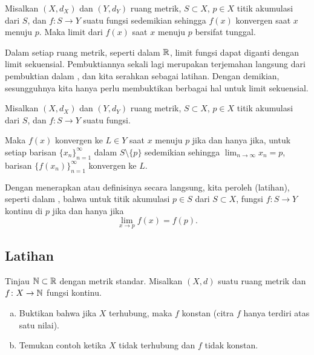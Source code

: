 \begin{prop} \label{prop:mslimitisunique}
Misalkan $(X,d_X)$ dan $(Y,d_Y)$ ruang metrik, $S \subset X$, $p \in X$
titik akumulasi dari $S$, dan $f \colon S \to Y$ suatu fungsi
sedemikian sehingga $f(x)$ konvergen saat $x$ menuju $p$.  Maka
limit dari $f(x)$ saat $x$ menuju $p$ bersifat tunggal.
\end{prop}

Dalam setiap ruang metrik, seperti dalam ${\mathbb{R}}$, limit fungsi dapat
diganti dengan limit sekuensial.  Pembuktiannya sekali lagi merupakan terjemahan langsung
dari pembuktian dalam , dan kita serahkan sebagai
latihan.  Dengan demikian, sesungguhnya kita hanya perlu membuktikan berbagai hal untuk
limit sekuensial.

\begin{lemma}\label{ms:seqflimit:lemma}
Misalkan $(X,d_X)$ dan $(Y,d_Y)$ ruang metrik, $S \subset X$, $p \in X$
titik akumulasi dari $S$, dan $f \colon S \to Y$ suatu fungsi.

Maka
$f(x)$ konvergen ke $L \in Y$ saat $x$ menuju $p$ jika dan hanya jika, untuk setiap
barisan $\{ x_n \}_{n=1}^\infty$
dalam $S \setminus \{p\}$
sedemikian sehingga $\lim_{n\to\infty} x_n = p$,
barisan $\bigl\{ f(x_n) \bigr\}_{n=1}^\infty$ konvergen ke $L$.
\end{lemma}

Dengan menerapkan  atau definisinya secara langsung, kita peroleh
(latihan), seperti dalam , bahwa untuk titik akumulasi $p \in S$ dari $S
\subset X$, fungsi
$f \colon S \to Y$ kontinu di $p$ jika dan hanya jika
\begin{equation*}
\lim_{x \to p} f(x) = f(p) .
\end{equation*}

\subsection{Latihan}

\begin{exercise}
Tinjau ${\mathbb{N}} \subset {\mathbb{R}}$ dengan metrik standar.  Misalkan $(X,d)$ suatu
ruang metrik dan $f \colon X \to {\mathbb{N}}$ fungsi kontinu.
\begin{enumerate}[a)]
\item
Buktikan bahwa jika $X$ terhubung,
maka $f$ konstan (citra $f$ hanya terdiri atas satu nilai).
\item
Temukan contoh ketika $X$ tidak terhubung dan $f$ tidak konstan.
\end{enumerate}
\end{exercise}

